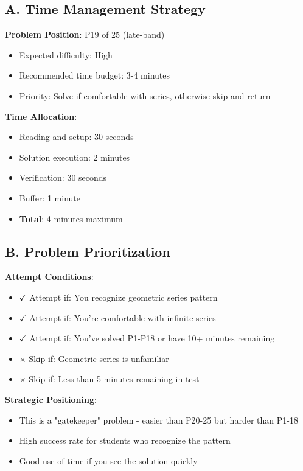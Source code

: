 \documentclass[11pt]{article}
\begin{document}
\begin{competitionbox}
\subsection*{A. Time Management Strategy}

\textbf{Problem Position}: P19 of 25 (late-band)
\begin{itemize}
    \item Expected difficulty: High
    \item Recommended time budget: 3-4 minutes
    \item Priority: Solve if comfortable with series, otherwise skip and return
\end{itemize}

\textbf{Time Allocation}:
\begin{itemize}
    \item Reading and setup: 30 seconds
    \item Solution execution: 2 minutes
    \item Verification: 30 seconds
    \item Buffer: 1 minute
    \item \textbf{Total}: 4 minutes maximum
\end{itemize}

\subsection*{B. Problem Prioritization}

\textbf{Attempt Conditions}:
\begin{itemize}
    \item $\checkmark$ Attempt if: You recognize geometric series pattern
    \item $\checkmark$ Attempt if: You're comfortable with infinite series
    \item $\checkmark$ Attempt if: You've solved P1-P18 or have 10+ minutes remaining
    \item $\times$ Skip if: Geometric series is unfamiliar
    \item $\times$ Skip if: Less than 5 minutes remaining in test
\end{itemize}

\textbf{Strategic Positioning}:
\begin{itemize}
    \item This is a "gatekeeper" problem - easier than P20-25 but harder than P1-18
    \item High success rate for students who recognize the pattern
    \item Good use of time if you see the solution quickly
\end{itemize}


\end{competitionbox}
\end{document}
